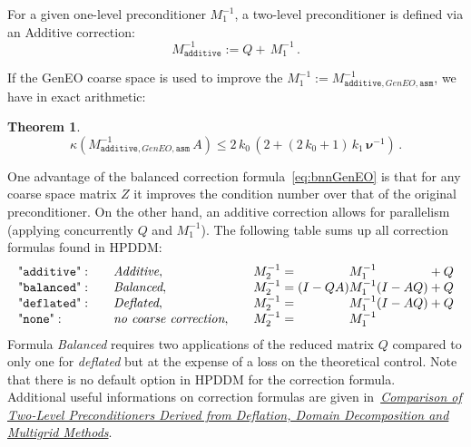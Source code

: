 \documentclass{article}
\newtheorem{theorem}{Theorem}[section]
\begin{document}
For a given one-level preconditioner $M_1^{-1}$, a two-level preconditioner is defined via an Additive correction:
\begin{equation}
  \label{eq:add}
  \boxed{
 M_{\texttt{additive}}^{-1} := Q+\,M_{1}^{-1}\,.
 }
\end{equation}


If the GenEO coarse space is used to improve the $M_1^{-1}:=M_{\texttt{additive},GenEO,\texttt{asm}}^{-1}$, we have in exact arithmetic:
\begin{theorem}
  \label{th:geneoadditive}
\[
 \kappa({M_{\texttt{additive},GenEO,\texttt{asm}}^{-1}\,A}) \le 2\,k_0\,(2+(2\,k_0+1)\,k_1\,\boldsymbol{\nu}^{-1})\,.
\]
\end{theorem}
One advantage of the balanced correction formula~\eqref{eq:bnnGenEO} is that for any coarse space matrix $Z$ it improves the condition number over that of the original preconditioner. On the other hand, an additive correction allows for parallelism (applying concurrently $Q$ and $M_{1}^{-1}$). The following table sums up all correction formulas found in HPDDM: 
\begin{equation}
\begin{array}{llll}
\nonumber
    \text{"\texttt{additive}"}:&&\textit{Additive}, \quad &M^{-1}_2 = \phantom{(I - Q A) }M^{-1}_1\phantom{ (I - A Q)} + Q\\
    \text{"\texttt{balanced}"}:&&\textit{Balanced}, \quad &M^{-1}_2 = (I - Q A) M^{-1}_1 (I - A Q) + Q\\
    \text{"\texttt{deflated}"}:&&\textit{Deflated}, \quad &M^{-1}_2 = \phantom{(I - Q A)} M^{-1}_1 (I - A Q) + Q\\
    \text{"\texttt{none}"}:&&\textit{no coarse correction}, \quad &M^{-1}_2 = \phantom{(I - Q A) }M^{-1}_1\phantom{ (I - A Q)}\\
\end{array}
\end{equation}
Formula \textit{Balanced} requires two applications of the reduced matrix $Q$ compared to only one for  \textit{deflated} but at the expense of a loss on the theoretical control. Note that there is no default option in HPDDM for the correction formula.\\
Additional useful informations on correction formulas are given in~\href{https://link.springer.com/article/10.1007/s10915-009-9272-6}{{\em Comparison of Two-Level Preconditioners Derived from Deflation, Domain Decomposition and Multigrid Methods}}. 
\end{document}
